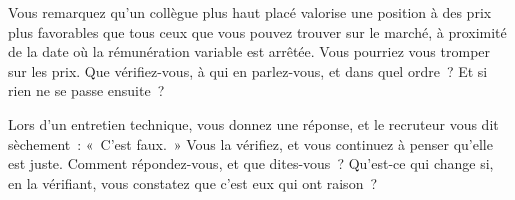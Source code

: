 \begin{question}\label{iq:iv2:behavioural-and-fit:29}
Vous remarquez qu'un collègue plus haut placé valorise une position à des prix plus favorables que tous ceux que vous pouvez trouver sur le marché, à proximité de la date où la rémunération variable est arrêtée. Vous pourriez vous tromper sur les prix. Que vérifiez-vous, à qui en parlez-vous, et dans quel ordre~? Et si rien ne se passe ensuite~?
\end{question}

\begin{question}\label{iq:iv2:behavioural-and-fit:30}
Lors d'un entretien technique, vous donnez une réponse, et le recruteur vous dit sèchement~: «~C'est faux.~» Vous la vérifiez, et vous continuez à penser qu'elle est juste. Comment répondez-vous, et que dites-vous~? Qu'est-ce qui change si, en la vérifiant, vous constatez que c'est eux qui ont raison~?
\end{question}
